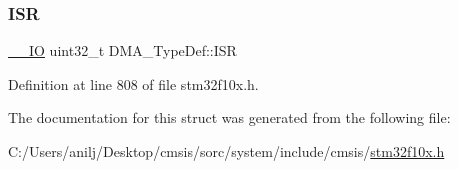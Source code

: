 \mbox{\label{struct_d_m_a___type_def_aa341a859df2f59bf6c0f7a000ab8734b}} 
\subsubsection{\texorpdfstring{I\+SR}{ISR}}
{\footnotesize\ttfamily \hyperlink{core__sc300_8h_aec43007d9998a0a0e01faede4133d6be}{\+\_\+\+\_\+\+IO} uint32\+\_\+t D\+M\+A\+\_\+\+Type\+Def\+::\+I\+SR}



Definition at line 808 of file stm32f10x.\+h.



The documentation for this struct was generated from the following file\+:\begin{DoxyCompactItemize}
\item 
C\+:/\+Users/anilj/\+Desktop/cmsis/sorc/system/include/cmsis/\hyperlink{stm32f10x_8h}{stm32f10x.\+h}\end{DoxyCompactItemize}
